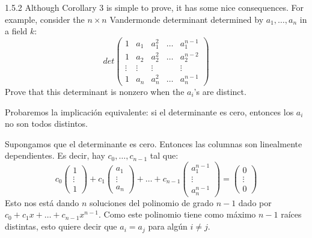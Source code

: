\documentclass[twoside]{article}
\begin{document}
\begin{ejercicio}{1.5.2}
Although Corollary 3 is simple to prove, it has some nice consequences. For example, consider the $n \times n$ Vandermonde determinant determined by $a_1,\dots,a_n$ in a field $k$:
\[ det\begin{pmatrix}
1 & a_1 & a_1^2 & \dots & a_1^{n-1}\\
1 & a_2 & a_2^2 & \dots & a_2^{n-2}\\
\vdots & \vdots & \vdots & & \vdots\\
1 & a_n & a_n^2 & \dots & a_n^{n-1}
\end{pmatrix}\]
Prove that this determinant is nonzero when the $a_i$'s are distinct.
\end{ejercicio}
\begin{solucion}
Probaremos la implicación equivalente: si el determinante es cero, entonces los $a_i$ no son todos distintos.

Supongamos que el determinante es cero.
Entonces las columnas son linealmente dependientes.
Es decir, hay $c_0,\dots,c_{n-1}$ tal que:
\[ c_0 \begin{pmatrix} 1\\\vdots\\1\end{pmatrix} + c_1\begin{pmatrix} a_1\\\vdots\\a_n\end{pmatrix}+ \dots + c_{n-1}\begin{pmatrix} a_1^{n-1}\\\vdots\\a_n^{n-1}\end{pmatrix} = \begin{pmatrix}0\\\vdots\\0\end{pmatrix}\]
Esto nos está dando $n$ soluciones del polinomio de grado $n-1$ dado por $c_0 + c_1 x + \dots + c_{n-1}x^{n-1}$.
Como este polinomio tiene como máximo $n-1$ raíces distintas, esto quiere decir que $a_i = a_j$ para algún $i \neq j$.
\end{solucion}

\newpage
\end{document}
